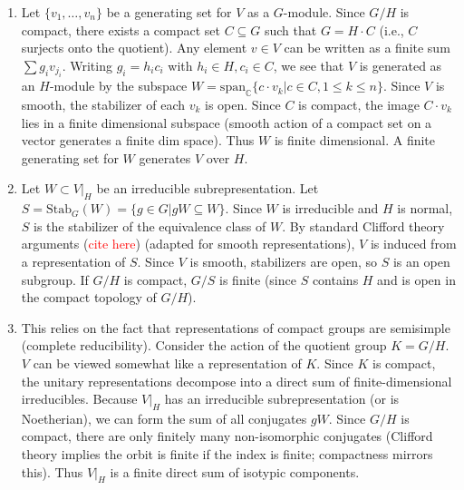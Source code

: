 \documentclass{article}
\renewcommand{\mid}{\big|}
\begin{document}
\begin{Proof}
    \begin{enumerate}
      \item
        Let $\{v_1, \dots, v_n\}$ be a generating set for $V$ as a $G$-module. Since $G/H$ is compact, there exists a
        compact set $C \subseteq G$ such that $G = H \cdot C$ (i.e., $C$ surjects onto the quotient).
        Any element $v \in V$ can be written as a finite sum $\sum g_i v_{j_i}$. Writing $g_i = h_i c_i$ with $h_i \in H, c_i \in C$,
        we see that $V$ is generated as an $H$-module by the subspace $W = \mathrm{span}_{\mathbb{C}} \{ c \cdot v_k \mid c \in C, 1 \le k \le n \}$.
        Since $V$ is smooth, the stabilizer of each $v_k$ is open. Since $C$ is compact, the image $C \cdot v_k$ lies in a finite dimensional
        subspace (smooth action of a compact set on a vector generates a finite dim space). Thus $W$ is finite dimensional.
        A finite generating set for $W$ generates $V$ over $H$.

      \item
        Let $W \subset V|_H$ be an irreducible subrepresentation. Let $S = \mathrm{Stab}_G(W) = \{g \in G \mid gW \subseteq W\}$.
        Since $W$ is irreducible and $H$ is normal, $S$ is the stabilizer of the equivalence class of $W$.
        By standard Clifford theory arguments (\textcolor{red}{cite here}) (adapted for smooth representations), $V$ is induced from a representation of $S$.
        Since $V$ is smooth, stabilizers are open, so $S$ is an open subgroup.
        If $G/H$ is compact, $G/S$ is finite (since $S$ contains $H$ and is open in the compact topology of $G/H$).

      \item
        This relies on the fact that representations of compact groups are semisimple (complete reducibility).
        Consider the action of the quotient group $K = G/H$. $V$ can be viewed somewhat like a representation of $K$.
        Since $K$ is compact, the unitary representations decompose into a direct sum of finite-dimensional irreducibles.
        Because $V|_H$ has an irreducible subrepresentation (or is Noetherian), we can form the sum of all conjugates $gW$.
        Since $G/H$ is compact, there are only finitely many non-isomorphic conjugates (Clifford theory implies the orbit is finite if the index is finite; compactness mirrors this).
        Thus $V|_H$ is a finite direct sum of isotypic components.
    \end{enumerate}
\end{Proof}
\end{document}
